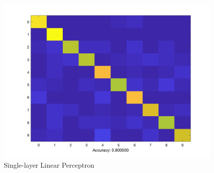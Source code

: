 \documentclass[letter, 10pt]{article}
\begin{document}
\begin{figure}[H]
    \endminipage\hfill
        \centering
        \includegraphics[width=1.1\textwidth]{HW4/RESULT/SLPLINEAR_CONFUSION.png}
    \endminipage\hfill
    \caption{Single-layer Linear Perceptron}
\end{figure}
\end{document}
